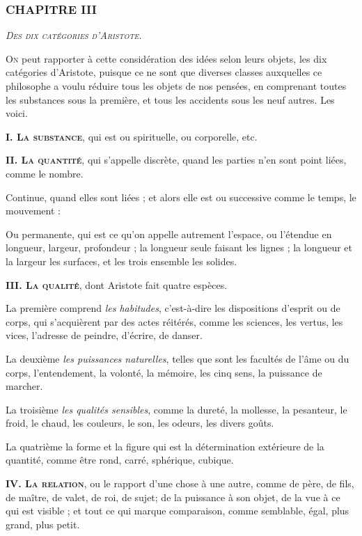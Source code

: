 \subsubsection{\centering \Large CHAPITRE III}
\begin{center}\emph{\large\scshape Des dix catégories d'Aristote.}\end{center}

	\lettrine{O}{n} peut rapporter à cette considération des idées selon leurs objets, les dix catégories d'Aristote, puisque ce ne sont que diverses classes auxquelles ce philosophe a voulu réduire tous les objets de nos pensées, en comprenant toutes les substances sous la première, et tous les accidents sous les neuf autres. Les voici.

\bigbreak
{\bfseries\scshape I. La substance}, qui est ou spirituelle, ou corporelle, etc.
\bigbreak

{\bfseries\scshape II. La quantité}, qui s'appelle discrète, quand les parties n'en sont point liées, comme le nombre.

Continue, quand elles sont liées ; et alors elle est ou successive comme le temps, le mouvement :

Ou permanente, qui est ce qu'on appelle autrement l'espace, ou l'étendue en longueur, largeur, profondeur ; la longueur seule faisant les lignes ; la longueur et la largeur les surfaces, et les trois ensemble les solides.

\bigbreak
{\bfseries\scshape III. La qualité}, dont Aristote fait quatre espèces.

La première comprend \emph{les habitudes}, c'est-à-dire les dispositions d'esprit ou de corps, qui s'acquièrent par des actes réitérés, comme les sciences, les vertus, les vices, l'adresse de peindre, d'écrire, de danser.

La deuxième \emph{les puissances naturelles}, telles que sont les facultés de l'âme ou du corps, l'entendement, la volonté, la mémoire, les cinq sens, la puissance de marcher.

La troisième \emph{les qualités sensibles}, comme la dureté, la mollesse, la pesanteur, le froid, le chaud, les couleurs, le son, les odeurs, les divers goûts.

La quatrième la forme et la figure qui est la détermination extérieure de la quantité, comme être rond, carré, sphérique, cubique.

\bigbreak
{\bfseries\scshape IV. La relation}, ou le rapport d'une chose à une autre, comme de père, de fils, de maître, de valet, de roi, de sujet; de la puissance à son objet, de la vue à ce qui est visible ; et tout ce qui marque comparaison, comme semblable, égal, plus grand, plus petit.

